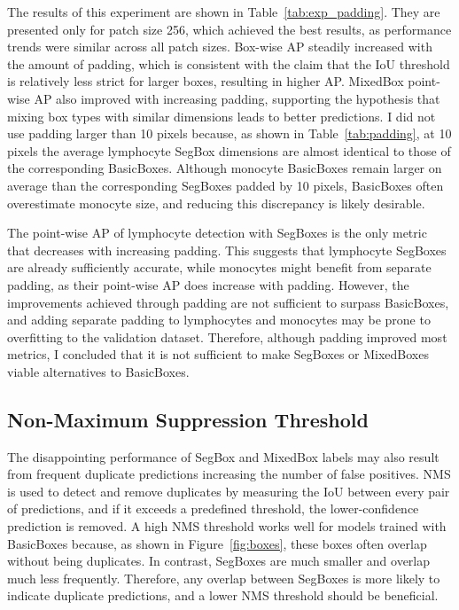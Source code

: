 The results of this experiment are shown in Table~\ref{tab:exp_padding}. They are presented only for patch size 256, which achieved the best results, as performance trends were similar across all patch sizes. Box-wise AP steadily increased with the amount of padding, which is consistent with the claim that the IoU threshold is relatively less strict for larger boxes, resulting in higher AP. MixedBox point-wise AP also improved with increasing padding, supporting the hypothesis that mixing box types with similar dimensions leads to better predictions. I did not use padding larger than 10 pixels because, as shown in Table~\ref{tab:padding}, at 10 pixels the average lymphocyte SegBox dimensions are almost identical to those of the corresponding BasicBoxes. Although monocyte BasicBoxes remain larger on average than the corresponding SegBoxes padded by 10 pixels, BasicBoxes often overestimate monocyte size, and reducing this discrepancy is likely desirable.

The point-wise AP of lymphocyte detection with SegBoxes is the only metric that decreases with increasing padding. This suggests that lymphocyte SegBoxes are already sufficiently accurate, while monocytes might benefit from separate padding, as their point-wise AP does increase with padding. However, the improvements achieved through padding are not sufficient to surpass BasicBoxes, and adding separate padding to lymphocytes and monocytes may be prone to overfitting to the validation dataset. Therefore, although padding improved most metrics, I concluded that it is not sufficient to make SegBoxes or MixedBoxes viable alternatives to BasicBoxes.

\subsection{Non-Maximum Suppression Threshold}
The disappointing performance of SegBox and MixedBox labels may also result from frequent duplicate predictions increasing the number of false positives. NMS is used to detect and remove duplicates by measuring the IoU between every pair of predictions, and if it exceeds a predefined threshold, the lower-confidence prediction is removed. A high NMS threshold works well for models trained with BasicBoxes because, as shown in Figure~\ref{fig:boxes}, these boxes often overlap without being duplicates. In contrast, SegBoxes are much smaller and overlap much less frequently. Therefore, any overlap between SegBoxes is more likely to indicate duplicate predictions, and a lower NMS threshold should be beneficial.

